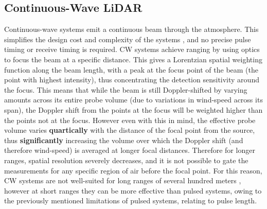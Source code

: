     \subsection{Continuous-Wave LiDAR}
    Continuous-wave systems emit a continuous beam through the atmosphere. This simplifies the design cost and complexity of the systems \cite{cariou_leosphere_nodate} \cite{hill_remote_nodate}, and no precise pulse timing or receive timing is required. CW systems achieve ranging by using optics to focus the beam at a specific distance. This gives a Lorentzian spatial weighting function along the beam length, with a peak at the focus point of the beam (the point with highest intensity), thus concentrating the detection sensitivity around the focus. This means that while the beam is still Doppler-shifted by varying amounts across its entire probe volume (due to variations in wind-speed across its span), the Doppler shift from the points at the focus will be weighted higher than the points not at the focus. However even with this in mind, the effective probe volume varies \textbf{quartically} with the distance of the focal point from the source, thus \textbf{significantly} increasing the volume over which the Doppler shift (and therefore wind-speed) is averaged at longer focal distances. Therefore for longer ranges, spatial resolution severely decreases, and it is not possible to gate the measurements for any specific region of air before the focal point. For this reason, CW systems are not well-suited for long ranges of several hundred meters \cite{hill_remote_nodate}, however at short ranges they can be more effective than pulsed systems, owing to the previously mentioned limitations of pulsed systems, relating to pulse length. 

    
    



    
    
   
        